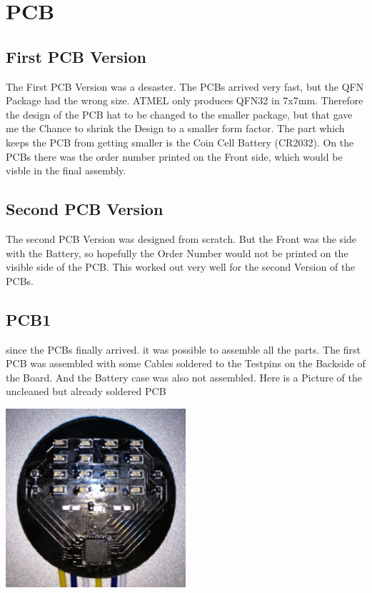 \newpage
\section{PCB}
\subsection{First PCB Version}
The First PCB Version was a desaster. The PCBs arrived very fast, but the QFN Package had the wrong size.
ATMEL only produces QFN32 in 7x7mm. Therefore the design of the PCB hat to be changed to the smaller package,
but that gave me the Chance to shrink the Design to a smaller form factor.
The part which keeps the PCB from getting smaller is the Coin Cell Battery (CR2032).
On the PCBs there was the order number printed on the Front side, which would be visble in the final assembly.
\subsection{Second PCB Version}

The second PCB Version was designed from scratch. But the Front was the side with the Battery, so hopefully the Order Number would not be printed on the visible side of the PCB. This worked out very well for the second Version of the PCBs.
\subsection{PCB1}

since the PCBs finally arrived. it was possible to assemble all the parts.
The first PCB was assembled with some Cables soldered to the Testpins on the Backside of the Board.
And the Battery case was also not assembled.
Here is a Picture of the uncleaned but already soldered PCB
\begin{center}
  \includegraphics[width=0.5\textwidth]{../Pictures/PCB1_F1.jpg}
\end{center}

